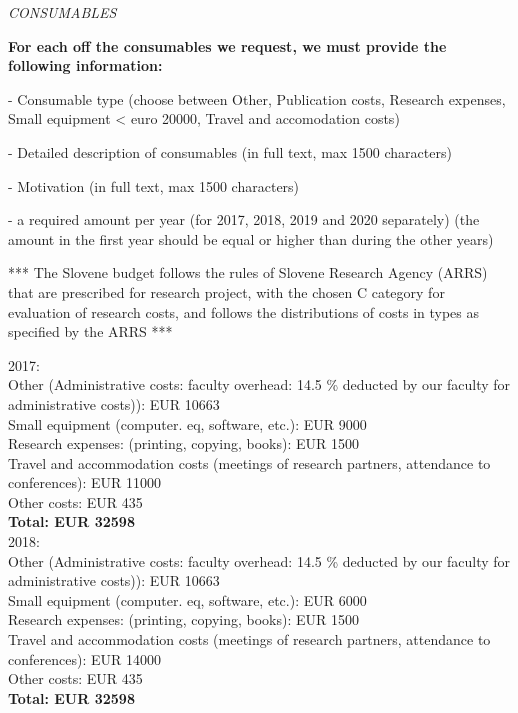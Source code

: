 \documentclass[11pt,dvipsnames,usenames,a4paper]{article}
\begin{document}

{\it CONSUMABLES}

{\bf\color{blue}For each off the consumables we request, we must provide the following information:

- Consumable type (choose between Other, Publication costs, Research expenses, Small equipment < euro 20000, Travel and accomodation costs)

- Detailed description of consumables (in full text, max 1500 characters)

- Motivation (in full text, max 1500 characters)

- a required amount per year (for 2017, 2018, 2019 and 2020 separately) (the amount in the first year should be equal or higher than during the other years)
}


*** The Slovene budget follows the rules of Slovene Research Agency (ARRS) that are prescribed for research project, with the chosen C category for evaluation of research costs, and follows the distributions of costs in types as specified by the ARRS ***


2017: \\
Other (Administrative costs: faculty overhead: 14.5 \% deducted by our faculty for administrative costs)): EUR 10663 \\
Small equipment (computer. eq, software, etc.): EUR 9000 \\
Research expenses: (printing, copying, books): EUR 1500 \\
Travel and accommodation costs (meetings of research partners, attendance to conferences): EUR 11000  \\
Other costs: EUR 435 \\
\textbf{Total: EUR 32598} \\

2018: \\
Other (Administrative costs: faculty overhead: 14.5 \% deducted by our faculty for administrative costs)): EUR 10663 \\
Small equipment (computer. eq, software, etc.): EUR 6000 \\
Research expenses: (printing, copying, books): EUR 1500 \\
Travel and accommodation costs (meetings of research partners, attendance to conferences): EUR 14000  \\
Other costs: EUR 435 \\
\textbf{Total: EUR 32598} \\
\end{document}
